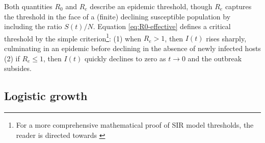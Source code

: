 Both quantities $R_0$ and $R_e$ describe an epidemic threshold, though $R_e$ captures the threshold in the face
of a (finite) declining susceptible population by including the ratio $S(t)/N$.
Equation \ref{eq:R0-effective} defines a critical threshold by the simple criterion\footnote{
For a more comprehensive mathematical proof of SIR
model thresholds, the reader is directed towards \cite{weiss2013sir}}:
(1) when $R_e > 1$, then $I(t)$ rises sharply, culminating in an epidemic before declining in the absence of newly
infected hosts
(2) if $R_e \leq 1$, then $I(t)$ quickly declines to zero as $t\rightarrow 0$ and the outbreak subsides.


\subsection{Logistic growth}
\label{sec:logistic-growth}

